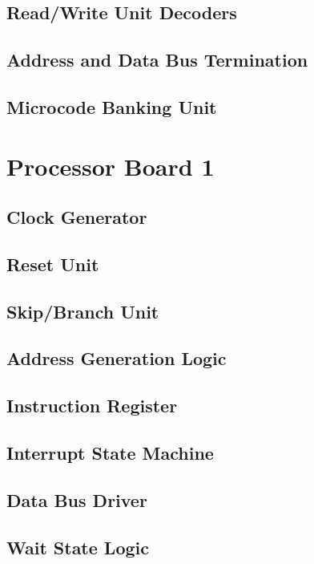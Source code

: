 



\subsection{Read/Write Unit Decoders}
\subsection{Address and Data Bus Termination}
\subsection{Microcode Banking Unit}

\section{Processor Board 1}
\subsection{Clock Generator}
\subsection{Reset Unit}
\subsection{Skip/Branch Unit}
\subsection{Address Generation Logic}
\subsection{Instruction Register}
\subsection{Interrupt State Machine}
\subsection{Data Bus Driver}
\subsection{Wait State Logic}
